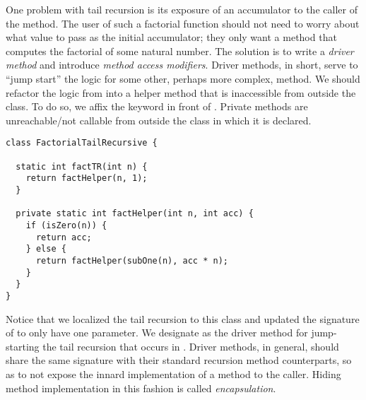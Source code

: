 One problem with tail recursion is its exposure of an accumulator to the caller of the method. The user of such a factorial function should not need to worry about what value to pass as the initial accumulator; they only want a method that computes the factorial of some natural number. The solution is to write a \textit{driver method} and introduce \textit{method access modifiers}. Driver methods, in short, serve to ``jump start'' the logic for some other, perhaps more complex, method. We should refactor the logic from  into a helper method that is inaccessible from outside the class. To do so, we affix the  keyword in front of . Private methods are unreachable/not callable from outside the class in which it is declared.

\begin{cl}[]{}
\begin{lstlisting}[language=MyJava]
class FactorialTailRecursive {
  
  static int factTR(int n) {
    return factHelper(n, 1);
  }

  private static int factHelper(int n, int acc) {
    if (isZero(n)) {
      return acc;
    } else {
      return factHelper(subOne(n), acc * n);
    }
  }
}
\end{lstlisting}
\end{cl}

Notice that we localized the tail recursion to this class and updated the signature of  to only have one parameter. We designate  as the driver method for jump-starting the tail recursion that occurs in . Driver methods, in general, should share the same signature with their standard recursion method counterparts, so as to not expose the innard implementation of a method to the caller. Hiding method implementation in this fashion is called \textit{encapsulation}. 


